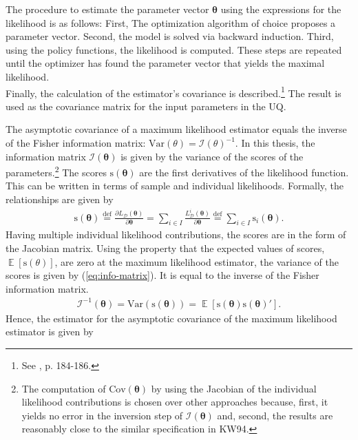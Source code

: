 \documentclass[a4paper,12pt]{article}
\DeclareMathOperator*{\E}{\mathbb{E}}
\newcommand*{\defeq}{\stackrel{\text{def}}{=}}
\begin{document}
The procedure to estimate the parameter vector $\pmb{\theta}$ using the expressions for the likelihood is as follows: First, The optimization algorithm of choice proposes a parameter vector. Second, the model is solved via backward induction. Third, using the policy functions, the likelihood is computed. These steps are repeated until the optimizer has found the parameter vector that yields the maximal likelihood.\\
\newline
Finally, the calculation of the estimator's covariance is described.\footnote{See \cite{Verbeek.2012}, p. 184-186.} The result is used as the covariance matrix for the input parameters in the UQ.

The asymptotic covariance of a maximum likelihood estimator equals the inverse of the Fisher information matrix: $\text{Var}(\theta)=\mathcal{I}(\theta)^{-1}$. In this thesis, the information matrix $\mathcal{I}(\pmb{\theta})$ is given by the variance of the scores of the parameters.\footnote{The computation of $\text{Cov}(\pmb{\theta})$ by using the Jacobian of the individual likelihood contributions is chosen over other approaches because, first, it yields no error in the inversion step of $\mathcal{I}(\pmb{\theta})$ and, second, the results are reasonably close to the similar specification in KW94.} The scores $\text{s}(\pmb{\theta})$ are the first derivatives of the likelihood function. This can be written in terms of sample and individual likelihoods. Formally, the relationships are given by
\begin{align} \label{eq:scores}
\text{s}(\pmb{\theta}) \defeq \frac{\partial L_{\pmb{\mathcal{D}}}({\pmb{\theta}})} {\partial \pmb{\theta}} = \sum_{i \in I} \frac{L_{\pmb{\mathcal{D}}}^{i}(\pmb{\theta})}{\partial \pmb{\theta}} \defeq \sum_{i \in I}\text{s}_i(\pmb{\theta}).
\end{align}
Having multiple individual likelihood contributions, the scores are in the form of the  Jacobian matrix.
Using the property that the expected values of scores, $\E[\text{s}(\theta)]$, are zero at the maximum likelihood estimator, the variance of the scores is given by (\ref{eq:info-matrix}). It is equal to the inverse of the Fisher information matrix.
\begin{align} \label{eq:info-matrix}
\mathcal{I}^{-1}(\pmb{\theta}) = \text{Var}(\text{s}(\pmb{\theta})) = \E[\text{s}(\pmb{\theta})\text{s}(\pmb{\theta})'].
\end{align}
Hence, the estimator for the asymptotic covariance of the maximum likelihood estimator is given by
\end{document}
